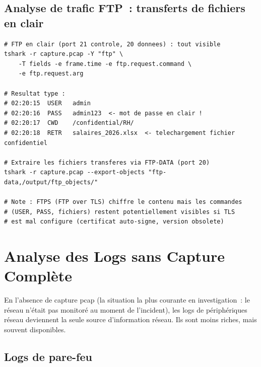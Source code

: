 \subsection{Analyse de trafic FTP~: transferts de fichiers en clair}

\begin{lstlisting}[language=bash_forensique,
    caption={Reconstruction de transferts FTP depuis une capture}]
# FTP en clair (port 21 controle, 20 donnees) : tout visible
tshark -r capture.pcap -Y "ftp" \
    -T fields -e frame.time -e ftp.request.command \
    -e ftp.request.arg

# Resultat type :
# 02:20:15  USER   admin
# 02:20:16  PASS   admin123  <- mot de passe en clair !
# 02:20:17  CWD    /confidential/RH/
# 02:20:18  RETR   salaires_2026.xlsx  <- telechargement fichier confidentiel

# Extraire les fichiers transferes via FTP-DATA (port 20)
tshark -r capture.pcap --export-objects "ftp-data,/output/ftp_objects/"

# Note : FTPS (FTP over TLS) chiffre le contenu mais les commandes
# (USER, PASS, fichiers) restent potentiellement visibles si TLS
# est mal configure (certificat auto-signe, version obsolete)
\end{lstlisting}

\section{Analyse des Logs sans Capture Complète}
\label{sec:analyse-logs}

En l'absence de capture pcap (la situation la plus courante en
investigation~: le réseau n'était pas monitoré au moment de l'incident),
les logs de périphériques réseau deviennent la seule source d'information
réseau. Ils sont moins riches, mais souvent disponibles.

\subsection{Logs de pare-feu}


